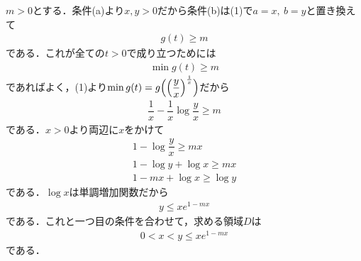 \documentclass[../../main.tex]{subfiles}
\begin{document}
$m>0$とする．条件(a)より$x,y>0$だから条件(b)は(1)で$a=x,\ b=y$と置き換えて
\begin{align}
  g(t) \ge m
\end{align}
である．これが全ての$t>0$で成り立つためには
\begin{align}
  \min g(t) \ge m
\end{align}
であればよく，(1)より$\min g(t)=g\Bigl(\Bigl(\dfrac{y}{x}\Bigr)^{\frac{1}{x}}\Bigr)$だから
\begin{align}
  \dfrac{1}{x}-\dfrac{1}{x}\log\dfrac{y}{x} \ge m
\end{align}
である．$x>0$より両辺に$x$をかけて
\begin{align}
  1 - \log\dfrac{y}{x} \ge mx \\
  1 - \log y + \log x \ge mx \\
  1 - mx + \log x \ge \log y
\end{align}
である．$\log x$は単調増加関数だから
\begin{align}
  y \le x e^{1-mx} \label{eq:1}
\end{align}
である．これと一つ目の条件を合わせて，求める領域$D$は
\begin{align}
  0 < x < y \le x e^{1-mx} \label{eq:2}
\end{align}
である．
\end{document}
